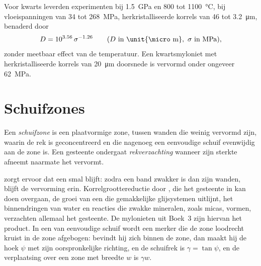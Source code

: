 Voor kwarts leverden experimenten bij \qty{1.5}{GPa} en 800 tot \qty{1100}{\celsius}, bij
vloeispanningen van 34 tot \qty{268}{MPa}, herkristalliseerde korrels van 46 tot
\qty{3.2}{\micro m}, benaderd door
\[
  D = 10^{3.56}\,\sigma^{-1.26}\qquad(D\text{ in \unit{\micro m}},\ \sigma\text{ in MPa}),
\]
zonder meetbaar effect van de temperatuur. Een kwartsmyloniet met
herkristalliseerde korrels van \qty{20}{\micro m} doorsnede is vervormd onder ongeveer
\qty{62}{MPa}.

\section{Schuifzones}

\begin{definition}\label{def:b3:deformation-mechanisms:shear-zone}
Een \emph{schuifzone} is een plaatvormige zone, tussen wanden die
weinig vervormd zijn, waarin de rek is geconcentreerd en die nagenoeg een
eenvoudige schuif evenwijdig aan de zone is. Een gesteente ondergaat \emph{rekverzachting}
wanneer zijn sterkte afneemt naarmate het vervormt.
\end{definition}

 zorgt ervoor dat een  smal blijft: zodra een band zwakker is
dan zijn wanden, blijft de vervorming erin. Korrelgroottereductie door , die het gesteente in  kan doen overgaan, de groei van een
 die gemakkelijke glijsystemen uitlijnt, het binnendringen van water en reacties die
zwakke mineralen, zoals micas, vormen, verzachten allemaal het gesteente. De mylonieten uit Boek~3 zijn hiervan het product.
In een  van eenvoudige schuif wordt een merker die de zone loodrecht kruist
in de zone afgebogen: bevindt hij zich binnen de zone, dan maakt hij de hoek
$\psi$ met zijn oorspronkelijke richting, en de schuifrek is $\gamma
= \tan\psi$, en de verplaatsing over een zone met breedte $w$ is $\gamma w$.


